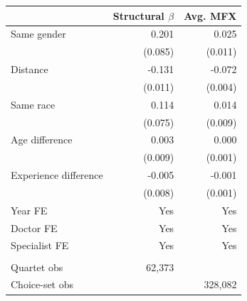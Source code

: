 
\begin{tabular}{lrr}
\toprule
 & Structural $\beta$ & Avg. MFX\\
\midrule
Same gender & 0.201 & 0.025\\
 & (0.085) & (0.011)\\
Distance & -0.131 & -0.072\\
 & (0.011) & (0.004)\\
Same race & 0.114 & 0.014\\
 & (0.075) & (0.009)\\
Age difference & 0.003 & 0.000\\
 & (0.009) & (0.001)\\
Experience difference & -0.005 & -0.001\\
 & (0.008) & (0.001)\\
\midrule
Year FE & Yes & Yes\\
Doctor FE & Yes & Yes\\
Specialist FE & Yes & Yes\\
\midrule\\
Quartet obs & 62,373 & \\
Choice-set obs &  & 328,082\\
\bottomrule
\end{tabular}
